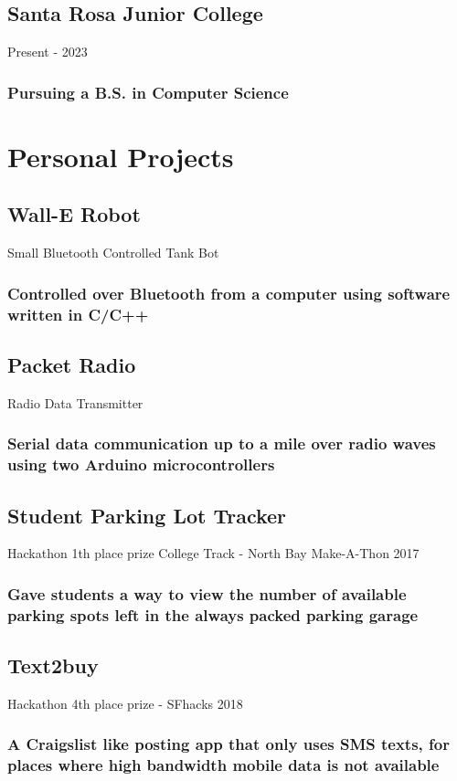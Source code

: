 \documentclass{article}
\begin{document}
        \subsection{Santa Rosa Junior College} Present - 2023 
        \vspace{-2mm}
            \subsubsection{Pursuing a B.S. in Computer Science}
\section{Personal Projects}

	\subsection{Wall-E Robot}Small Bluetooth Controlled Tank Bot
    	\vspace{-3mm}
		\subsubsection{Controlled over Bluetooth from a computer using software written in C/C++}
	\subsection{Packet Radio} Radio Data Transmitter
    	\vspace{-3mm}
		\subsubsection{ Serial data communication up to a mile over radio waves using two Arduino microcontrollers}
	\subsection{Student Parking Lot Tracker} Hackathon 1th place prize College Track - North Bay Make-A-Thon 2017
    	\vspace{-3mm}
		\subsubsection{Gave students a way to view the number of available parking spots left in the always packed parking garage}
		
	\subsection{Text2buy} Hackathon 4th place prize - SFhacks 2018
    	\vspace{-3mm}
		\subsubsection{A Craigslist  like posting app that only uses SMS texts, for places where high bandwidth mobile data is not available}
		
\end{document}

